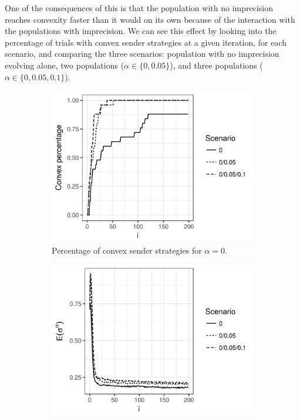 \documentclass[a4paper]{article}
\begin{document}
One of the consequences of this is that the population with no imprecision reaches convexity faster than it would on its own because of the interaction with the populations with imprecision.
We can see this effect by looking into the percentage of trials with convex sender strategies at a given iteration, for each scenario, and comparing the three scenarios: population with no imprecision evolving alone, two populations ($\alpha \in \{0, 0.05\}$), and three populations ($\alpha \in \{0, 0.05, 0.1\}$).
\begin{figure}
  \centering
  \begin{subfigure}[]{0.32\textwidth}
    \includegraphics[width=\textwidth]{simulation/results/round-3/plots/convex-percentage-all-strong.png}
    \caption{Percentage of convex sender strategies for $\alpha = 0$.}
    \label{fig:convexity-tight-interaction}
  \end{subfigure}
  \hfill
  \begin{subfigure}[]{0.32\textwidth}
    \includegraphics[width=\textwidth]{simulation/results/round-3/plots/entropy-sender-all-strong.png}

\end{subfigure}
\end{figure}
\end{document}
